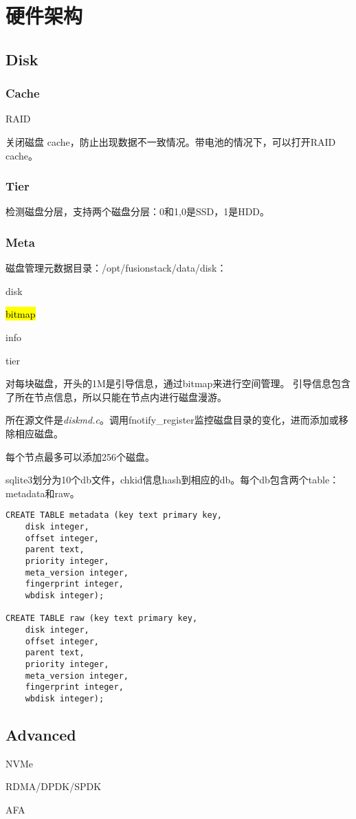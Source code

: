 \chapter{硬件架构}

\section{Disk}

\subsection{Cache}

RAID

关闭磁盘 cache，防止出现数据不一致情况。带电池的情况下，可以打开RAID cache。

\subsection{Tier}

检测磁盘分层，支持两个磁盘分层：0和1,0是SSD，1是HDD。

\subsection{Meta}

磁盘管理元数据目录：/opt/fusionstack/data/disk：
\begin{compactitem}
\item disk
\item \hl{bitmap}
\item info
\item tier
\end{compactitem}

对每块磁盘，开头的1M是引导信息，通过bitmap来进行空间管理。
引导信息包含了所在节点信息，所以只能在节点内进行磁盘漫游。

所在源文件是\emph{diskmd.c}。调用fnotify\_register监控磁盘目录的变化，进而添加或移除相应磁盘。

每个节点最多可以添加256个磁盘。

sqlite3划分为10个db文件，chkid信息hash到相应的db。每个db包含两个table：metadata和raw。

\begin{lstlisting}[frame=single]
CREATE TABLE metadata (key text primary key, 
    disk integer, 
    offset integer, 
    parent text, 
    priority integer, 
    meta_version integer, 
    fingerprint integer, 
    wbdisk integer);

CREATE TABLE raw (key text primary key, 
    disk integer, 
    offset integer, 
    parent text, 
    priority integer, 
    meta_version integer, 
    fingerprint integer, 
    wbdisk integer);
\end{lstlisting}

\section{Advanced}

NVMe

RDMA/DPDK/SPDK

AFA
